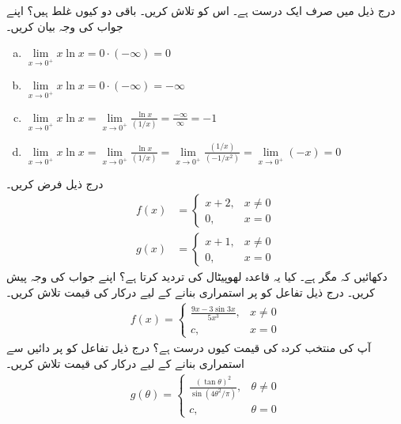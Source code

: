 درج ذیل میں صرف ایک درست ہے۔ اس کو تلاش کریں۔ باقی دو کیوں غلط ہیں؟ اپنے جواب کی وجہ بیان کریں۔
\begin{enumerate}[a.]
\item
$\lim\limits_{x\to 0^+}x\ln x=0\cdot(-\infty)=0$
\item
$\lim\limits_{x\to 0^+}x\ln x=0\cdot(-\infty)=-\infty$
\item
$\lim\limits_{x\to 0^+}x\ln x=\lim\limits_{x\to 0^+}\frac{\ln x}{(1/x)}=\frac{-\infty}{\infty}=-1$
\item
$\lim\limits_{x\to 0^+}x\ln x=\lim\limits_{x\to 0^+}\frac{\ln x}{(1/x)}=\lim\limits_{x\to 0^+}\frac{(1/x)}{(-1/{x^2})}=\lim\limits_{x\to 0^+}(-x)=0$
\end{enumerate}
درج ذیل فرض کریں۔
\begin{align*}
f(x)&=
\begin{cases}
x+2,&x\ne 0\\
0,&x=0
\end{cases}\\
g(x)&=
\begin{cases}
x+1,&x\ne 0\\
0,&x=0
\end{cases}
\end{align*}
دکھائیں کہ  مگر  ہے۔ کیا یہ قاعدہ لھوپیٹال کی تردید کرتا ہے؟ اپنے جواب  کی وجہ پیش کریں۔
درج ذیل تفاعل کو  پر استمراری بنانے کے لیے درکار  کی قیمت تلاش کریں۔
\begin{align*}
f(x)=
\begin{cases}
\frac{9x-3\sin 3x}{5x^3},&x\ne 0\\
c,&x=0
\end{cases}
\end{align*}
آپ کی منتخب کردہ  کی قیمت کیوں درست ہے؟
درج ذیل تفاعل کو  پر دائیں سے استمراری بنانے کے لیے درکار  کی قیمت تلاش کریں۔
\begin{align*}
g(\theta)=
\begin{cases}
\frac{(\tan\theta)^2}{\sin(4\theta^2/\pi)},&\theta\ne0\\
c,&\theta=0
\end{cases}
\end{align*}
